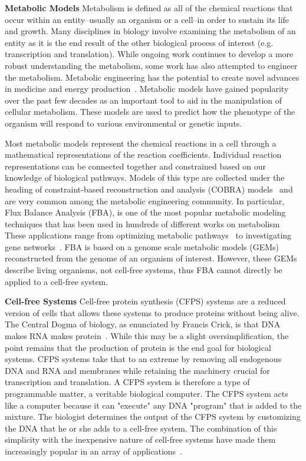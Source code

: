 \textbf{Metabolic Models}
Metabolism is defined as all of the chemical reactions that occur within an entity--usually an organism or a cell--in order to sustain its life and growth.
Many disciplines in biology involve examining the metabolism of an entity as it is the end result of the other biological process of interest (e.g. transcription and translation).
While ongoing work continues to develop a more robust understanding the metabolism, some work has also attempted to engineer the metabolism. 
Metabolic engineering has the potential to create novel advances in medicine and energy production~\cite{keasling2012synthetic}.
Metabolic models have gained popularity over the past few decades as an important tool to aid in the manipulation of cellular metabolism.
These models are used to predict how the phenotype of the organism will respond to various environmental or genetic inputs.

Most metabolic models represent the chemical reactions in a cell through a mathematical representations of the reaction coefficients.
Individual reaction representations can be connected together and constrained based on our knowledge of biological pathways.
Models of this type are collected under the heading of constraint-based reconstruction and analysis (COBRA) models~\cite{schellenberger2011quantitative} and are very common among the metabolic engineering community.
In particular, Flux Balance Analysis (FBA), is one of the most popular metabolic modeling techniques that has been used in hundreds of different works on metabolism~\cite{feist2008growing}
These applications range from optimizing metabolic pathways~\cite{almaas2004global} to investigating gene networks~\cite{shlomi2007genome}.
FBA is based on a genome scale metabolic models (GEMs) reconstructed from the genome of an organism of interest.
However, these GEMs describe living organisms, not cell-free systems, thus FBA cannot directly be applied to a cell-free system.

\textbf{Cell-free Systems}
Cell-free protein synthesis (CFPS) systems are a reduced version of cells that allows these systems to produce proteins without being alive.
The Central Dogma of biology, as enunciated by Francis Crick, is that DNA makes RNA makes protein~\cite{crick1970central}.
While this may be a slight oversimplification, the point remains that the production of protein is the end goal for biological systems.
CFPS systems take that to an extreme by removing all endogenous DNA and RNA and membranes while retaining the machinery crucial for transcription and translation.
A CFPS system is therefore a type of programmable matter, a veritable biological computer.
The CFPS system acts like a computer because it can "execute" any DNA "program" that is added to the mixture.
The biologist determines the output of the CFPS system by customizing the DNA that he or she adds to a cell-free system.
The combination of this simplicity with the inexpensive nature of cell-free systems have made them increasingly popular in an array of applications~\cite{}.

